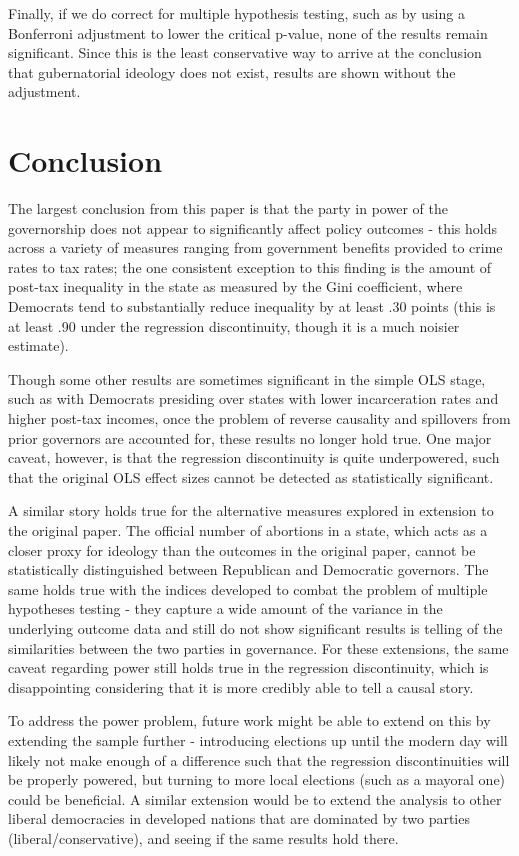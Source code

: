 \documentclass{article}
\begin{document}
Finally, if we do correct for multiple hypothesis testing, such as by using a Bonferroni adjustment to lower the critical p-value, none of the results remain significant. Since this is the least conservative way to arrive at the conclusion that gubernatorial ideology does not exist, results are shown without the adjustment.


\section{Conclusion}

The largest conclusion from this paper is that the party in power of the governorship does not appear to significantly affect policy outcomes - this holds across a variety of measures ranging from government benefits provided to crime rates to tax rates; the one consistent exception to this finding is the amount of post-tax inequality in the state as measured by the Gini coefficient, where Democrats tend to substantially reduce inequality by at least .30 points (this is at least .90 under the regression discontinuity, though it is a much noisier estimate). 

Though some other results are sometimes significant in the simple OLS stage, such as with Democrats presiding over states with lower incarceration rates and higher post-tax incomes, once the problem of reverse causality and spillovers from prior governors are accounted for, these results no longer hold true. One major caveat, however, is that the regression discontinuity is quite underpowered, such that the original OLS effect sizes cannot be detected as statistically significant. 

A similar story holds true for the alternative measures explored in extension to the original paper. The official number of abortions in a state, which acts as a closer proxy for ideology than the outcomes in the original paper, cannot be statistically distinguished between Republican and Democratic governors. The same holds true with the indices developed to combat the problem of multiple hypotheses testing - they capture a wide amount of the variance in the underlying outcome data and still do not show significant results is telling of the similarities between the two parties in governance. For these extensions, the same caveat regarding power still holds true in the regression discontinuity, which is disappointing considering that it is more credibly able to tell a causal story.

To address the power problem, future work might be able to extend on this by extending the sample further - introducing elections up until the modern day will likely not make enough of a difference such that the regression discontinuities will be properly powered, but turning to more local elections (such as a mayoral one) could be beneficial. A similar extension would be to extend the analysis to other liberal democracies in developed nations that are dominated by two parties (liberal/conservative), and seeing if the same results hold there.
\end{document}
